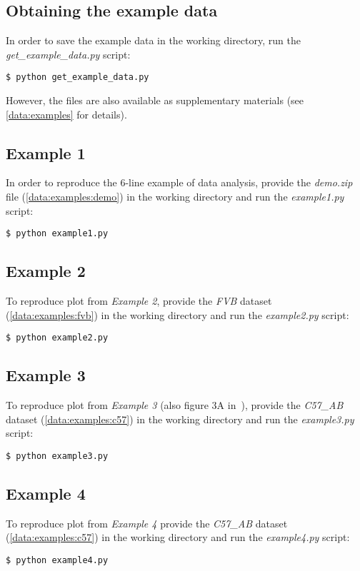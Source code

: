 \documentclass[smallextended]{svjour3}       %
\begin{document}
\subsection{Obtaining the example data}
\label{examples:data}
In order to save the example data in the working directory, run the
\emph{get\_example\_data.py} script:
\begin{verbatim}
$ python get_example_data.py
\end{verbatim}

However, the files are also available as supplementary materials (see
\ref{data:examples} for details).

\subsection{Example 1}
\label{examples:1}
In order to reproduce the 6-line example of data analysis, provide the
\emph{demo.zip} file (\ref{data:examples:demo}) in the working directory and
run the \emph{example1.py} script:
\begin{verbatim}
$ python example1.py
\end{verbatim}


\subsection{Example 2}
\label{examples:2}
To reproduce plot from \emph{Example 2},
provide the \emph{FVB} dataset (\ref{data:examples:fvb}) in the working
directory and run the \emph{example2.py} script:
\begin{verbatim}
$ python example2.py
\end{verbatim}


\subsection{Example 3}
\label{examples:3}
To reproduce plot from \emph{Example 3} (also figure 3A in~\cite{Puscian:2014cu}),
provide the \emph{C57\_AB} dataset (\ref{data:examples:c57}) in the working
directory and run the \emph{example3.py} script:
\begin{verbatim}
$ python example3.py
\end{verbatim}


\subsection{Example 4}
\label{examples:4}
To reproduce plot from \emph{Example 4} provide the \emph{C57\_AB}
dataset (\ref{data:examples:c57}) in the working directory and run the
\emph{example4.py} script:
\begin{verbatim}
$ python example4.py
\end{verbatim}
\end{document}
